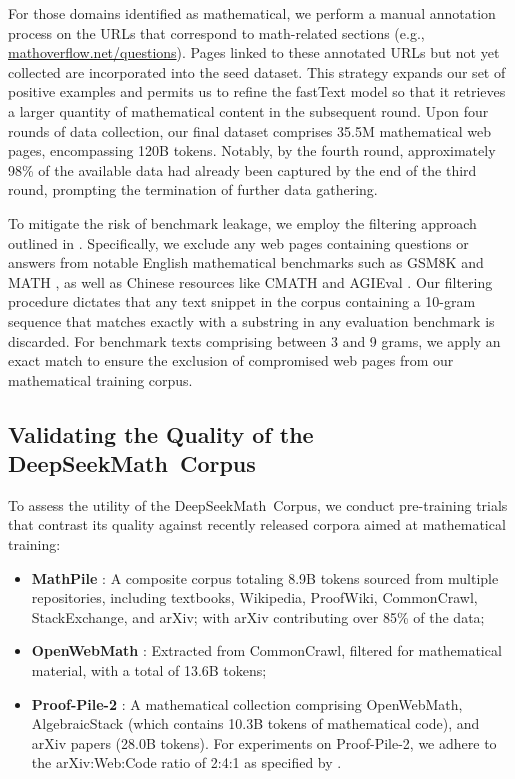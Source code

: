 \begin{itemize}[topsep=0pt]
For those domains identified as mathematical, we perform a manual annotation process on the URLs that correspond to math-related sections (e.g., \url{mathoverflow.net/questions}). Pages linked to these annotated URLs but not yet collected are incorporated into the seed dataset. This strategy expands our set of positive examples and permits us to refine the fastText model so that it retrieves a larger quantity of mathematical content in the subsequent round. Upon four rounds of data collection, our final dataset comprises 35.5M mathematical web pages, encompassing 120B tokens. Notably, by the fourth round, approximately 98\% of the available data had already been captured by the end of the third round, prompting the termination of further data gathering.

To mitigate the risk of benchmark leakage, we employ the filtering approach outlined in \cite{deepseek-coder}. Specifically, we exclude any web pages containing questions or answers from notable English mathematical benchmarks such as GSM8K \citep{gsm8k} and MATH \citep{MATH}, as well as Chinese resources like CMATH \citep{wei2023cmath} and AGIEval \citep{agieval}. Our filtering procedure dictates that any text snippet in the corpus containing a 10-gram sequence that matches exactly with a substring in any evaluation benchmark is discarded. For benchmark texts comprising between 3 and 9 grams, we apply an exact match to ensure the exclusion of compromised web pages from our mathematical training corpus.

\subsection{Validating the Quality of the DeepSeekMath~Corpus}

To assess the utility of the DeepSeekMath~Corpus, we conduct pre-training trials that contrast its quality against recently released corpora aimed at mathematical training:

\begin{itemize}[topsep=0pt]
    \item \textbf{MathPile} \citep{mathpile}: A composite corpus totaling 8.9B tokens sourced from multiple repositories, including textbooks, Wikipedia, ProofWiki, CommonCrawl, StackExchange, and arXiv; with arXiv contributing over 85\% of the data;
    \item \textbf{OpenWebMath} \citep{openwebmath}: Extracted from CommonCrawl, filtered for mathematical material, with a total of 13.6B tokens;
    \item \textbf{Proof-Pile-2} \citep{llemma}: A mathematical collection comprising OpenWebMath, AlgebraicStack (which contains 10.3B tokens of mathematical code), and arXiv papers (28.0B tokens). For experiments on Proof-Pile-2, we adhere to the arXiv:Web:Code ratio of 2:4:1 as specified by \cite{llemma}.
\end{itemize}


\end{itemize}
